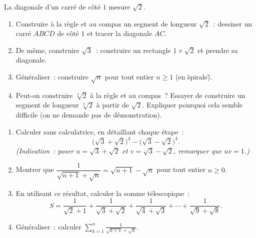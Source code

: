 \begin{challenge}
La diagonale d'un carr\'e de c\^ot\'e $1$ mesure $\sqrt{2}$.
\begin{enumerate}
  \item Construire \`a la r\`egle et au compas un segment de longueur
        $\sqrt{2}$~: dessiner un carr\'e $ABCD$ de c\^ot\'e $1$ et tracer
        la diagonale $AC$.
  \item De m\^eme, construire $\sqrt{3}$~: construire un rectangle $1\times\sqrt{2}$
        et prendre sa diagonale.
  \item G\'en\'eraliser~: construire $\sqrt{n}$ pour tout entier $n \geq 1$
        (en \"spirale\").
  \item Peut-on construire $\sqrt[3]{2}$ \`a la r\`egle et au compas~?
        Essayer de construire un segment de longueur $\sqrt[3]{2}$
        \`a partir de $\sqrt{2}$. Expliquer pourquoi cela semble difficile
        (on ne demande pas de d\'emonstration).
\end{enumerate}
\end{challenge}

\begin{challenge}
\begin{enumerate}
  \item Calculer sans calculatrice, en d\'etaillant chaque \'etape~:
        $$\bigl(\sqrt{3}+\sqrt{2}\bigr)^4 - \bigl(\sqrt{3}-\sqrt{2}\bigr)^4.$$
        \emph{(Indication~: poser $u=\sqrt{3}+\sqrt{2}$ et $v=\sqrt{3}-\sqrt{2}$,
        remarquer que $uv=1$.)}
  \item Montrer que $\dfrac{1}{\sqrt{n+1}+\sqrt{n}} = \sqrt{n+1}-\sqrt{n}$
        pour tout entier $n \geq 0$.
  \item En utilisant ce r\'esultat, calculer la somme t\'elescopique~:
        $$S = \frac{1}{\sqrt{2}+1} + \frac{1}{\sqrt{3}+\sqrt{2}}
             + \frac{1}{\sqrt{4}+\sqrt{3}} + \cdots + \frac{1}{\sqrt{9}+\sqrt{8}}.$$
  \item G\'en\'eraliser~: calculer
        $\displaystyle\sum_{k=1}^{n} \frac{1}{\sqrt{k+1}+\sqrt{k}}$.
\end{enumerate}
\end{challenge}

